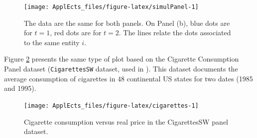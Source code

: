 \documentclass[
  12pt,
]{book}
\theoremstyle{definition}
\theoremstyle{definition}
\theoremstyle{definition}
\theoremstyle{definition}
\theoremstyle{remark}
\begin{document}
\begin{figure}
\texttt{[image: ApplEcts\_files/figure-latex/simulPanel-1]} \caption{The data are the same for both panels. On Panel (b), blue dots are for $t=1$, red dots are for $t=2$. The lines relate the dots associated to the same entity $i$.}\label{fig:simulPanel}
\end{figure}

Figure \ref{fig:cigarettes} presents the same type of plot based on the Cigarette Consumption Panel dataset (\texttt{CigarettesSW} dataset, used in \citet{Stock_Watson_2003}). This dataset documents the average consumption of cigarettes in 48 continental US states for two dates (1985 and 1995).

\begin{figure}
\texttt{[image: ApplEcts\_files/figure-latex/cigarettes-1]} \caption{Cigarette consumption versus real price in the CigarettesSW panel dataset.}\label{fig:cigarettes}
\end{figure}
\end{document}
